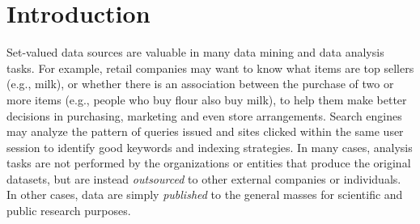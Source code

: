 \section{Introduction}
\label{sec:intro}
%
%
%
%
%


Set-valued data sources are valuable in many data mining and data analysis
tasks. For example, retail companies may want to know what items are top sellers
(e.g., milk), or whether there is an association between the purchase of
two or more items (e.g., people who buy flour also buy milk),
to help them make better decisions in purchasing, marketing and even store
arrangements. Search engines may analyze the pattern of queries issued and
sites clicked within the same user session to identify good keywords and
indexing strategies. In many cases, analysis tasks are not performed by the
organizations or entities that produce the original datasets, but are instead
{\em outsourced} to other external companies or individuals. In other cases,
data are simply {\em published} to the general masses for
scientific and public research purposes.

